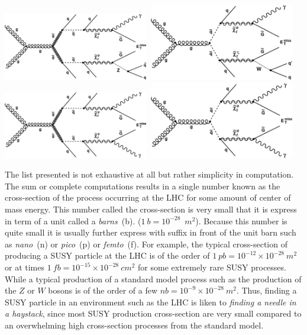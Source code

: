 {\begin{center}\label{feynman_gsDiag}
\centering
\mbox{\includegraphics[width=2.5in]{THESISPLOTS/SinglePhoton_gluino.pdf} \quad \quad
\includegraphics[width=2.5in]{THESISPLOTS/SinglePhoton_squark.pdf}} \\
\hspace{0.5cm}
\mbox{\includegraphics[width=2.5in]{THESISPLOTS/Diphoton_gluino.pdf} \quad \quad
\includegraphics[width=2.5in]{THESISPLOTS/Diphoton_squark.pdf}}
\label{fig:feynman_gsDiag}
\end{center}

The list presented  is not exhaustive at all but rather simplicity in computation. The sum or complete computations results in a single number known as the cross-section of the process occurring at the LHC for some amount of center of mass energy. This number called the cross-section is very small that it is express in term of a unit called a \textit{barns}~(b). ($1~b = 10^{-28}$~$m^{2}$). Because this number is quite small it is usually further express with suffix in front of the unit barn such as \textit{nano}~(n) or \textit{pico}~(p) or \textit{femto}~(f). For example, the typical cross-section of producing a SUSY particle at the LHC is of the order of $1~pb =10^{-12}\times 10^{-28}~m^{2}$ or at times $1~fb = 10^{-15}\times 10^{-28}~cm^{2}$ for some extremely rare SUSY processes. While a typical production of a standard model process such as the production of the $Z$ or $W$ bosons is of the order of a few $nb = 10^{-9}\times 10^{-28}~m^{2}$. Thus, finding a SUSY particle in an environment such as the LHC is liken to \textit{finding a needle in a haystack}, since most SUSY production cross-section are very small compared to an overwhelming high cross-section processes from the standard model.

}

